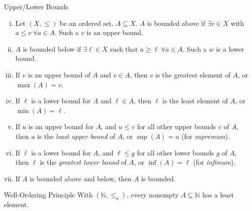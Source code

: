 \documentclass[10pt]{extarticle}
\newcommand{\N}{\mathbb{N}}
\begin{document}
  \begin{problem}{Upper/Lower Bounds}
    \begin{enumerate}[(i)]
      \item Let $(X,\leq)$ be an ordered set, $A\subseteq X$. $A$ is bounded above if $\exists v\in X$ with $a\leq v~\forall a\in A$. Such a $v$ is an upper bound.
      \item $A$ is bounded below if $\exists \ell\in X$ such that $a\geq \ell~\forall a\in A$. Such a $w$ is a lower bound.
      \item If $v$ is an upper bound of $A$ and $v\in A$, then $v$ is the greatest element of $A$, or $\max(A) = v$.
      \item If $\ell$ is a lower bound for $A$ and $\ell\in A$, then $\ell$ is the least element of $A$, or $\min(A) = \ell$.
      \item If $u$ is an upper bound for $A$, and $u \leq v$ for all other upper bounds $v$ of $A$, then $u$ is the \textit{least upper bound} of $A$, or $\sup(A) = u$ (for \textit{supremum}).
      \item If $\ell$ is a lower bound for $A$, and $\ell \leq g$ for all other lower bounds $g$ of $A$, then $\ell$ is the \textit{greatest lower bound} of $A$, or $\inf(A) = \ell$ (for \textit{infimum}).
      \item If $A$ is bounded above and below, then $A$ is bounded.
    \end{enumerate}
  \end{problem}
  \begin{problem}{Well-Ordering Principle}
    With $(\N,\leq_a)$, every nonempty $A\subseteq \N$ has a least element.
  \end{problem}
\end{document}
